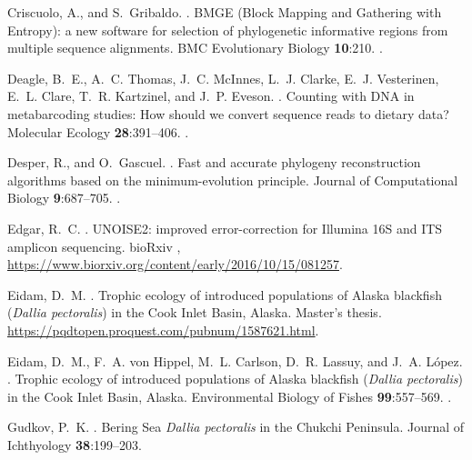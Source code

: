\begin{multicols}{2}
\begin{thebibliography}{37}
Criscuolo, A., and S.~Gribaldo.
.
\newblock BMGE (Block Mapping and Gathering with Entropy): a new software for
  selection of phylogenetic informative regions from multiple sequence
  alignments.
\newblock BMC Evolutionary Biology {\bfseries 10}:210.
\newblock {}.

Deagle, B.~E., A.~C. Thomas, J.~C. McInnes, L.~J. Clarke, E.~J. Vesterinen,
  E.~L. Clare, T.~R. Kartzinel, and J.~P. Eveson.
.
\newblock Counting with DNA in metabarcoding studies: How should we convert
  sequence reads to dietary data?
\newblock Molecular Ecology {\bfseries 28}:391--406.
\newblock {}.

Desper, R., and O.~Gascuel.
.
\newblock Fast and accurate phylogeny reconstruction algorithms based on the
  minimum-evolution principle.
\newblock Journal of Computational Biology {\bfseries 9}:687--705.
\newblock {}.

Edgar, R.~C.
.
\newblock UNOISE2: improved error-correction for Illumina 16S and ITS amplicon
  sequencing.
\newblock bioRxiv ,
  \urlprefix\url{https://www.biorxiv.org/content/early/2016/10/15/081257}.

Eidam, D.~M.
.
\newblock Trophic ecology of introduced populations of Alaska blackfish
  (\textit{Dallia pectoralis}) in the Cook Inlet Basin, Alaska.
\newblock Master's thesis.
\newblock \urlprefix\url{https://pqdtopen.proquest.com/pubnum/1587621.html}.

Eidam, D.~M., F.~A. von Hippel, M.~L. Carlson, D.~R. Lassuy, and J.~A.
  L{\'o}pez.
.
\newblock Trophic ecology of introduced populations of Alaska blackfish
  (\textit{Dallia pectoralis}) in the Cook Inlet Basin, Alaska.
\newblock Environmental Biology of Fishes {\bfseries 99}:557--569.
\newblock {}.

Gudkov, P.~K.
.
\newblock Bering Sea \textit{Dallia pectoralis} in the Chukchi Peninsula.
\newblock Journal of Ichthyology {\bfseries 38}:199--203.


\end{thebibliography}
\end{multicols}

